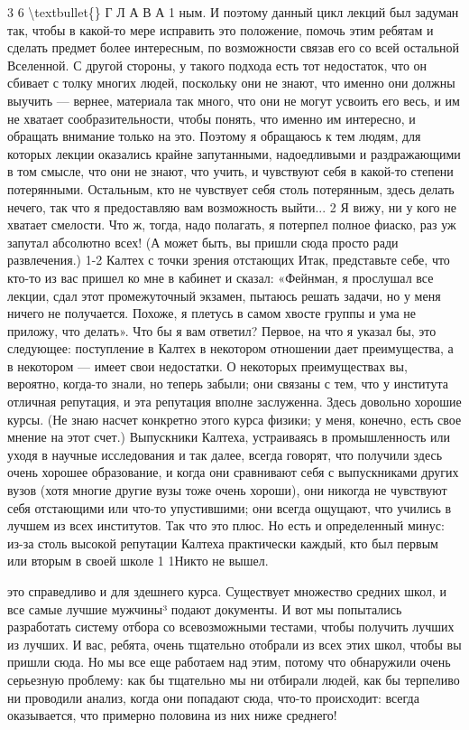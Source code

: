 \documentclass[10pt,oneside]{article}
\begin{document}
3 6 \textbackslash{}textbullet\{\} Г Л А В А  1 ным. И поэтому данный цикл лекций был задуман так, чтобы в какой-то мере исправить это положение, помочь этим ребятам и сделать предмет более интересным, по возможности связав его со всей остальной Вселенной. С другой стороны, у такого подхода есть тот недостаток, что он сбивает с толку многих людей, поскольку они не знают, что именно они должны выучить --- вернее, материала так много, что они не могут усвоить его весь, и им не хватает сообразительности, чтобы понять, что именно им интересно, и обращать внимание только на это. Поэтому я обращаюсь к тем людям, для которых лекции оказались крайне запутанными, надоедливыми и раздражающими в том смысле, что они не знают, что учить, и чувствуют себя в какой-то степени потерянными. Остальным, кто не чувствует себя столь потерянным, здесь делать нечего, так что я предоставляю вам возможность выйти... 2 Я вижу, ни у кого не хватает смелости. Что ж, тогда, надо полагать, я потерпел полное фиаско, раз уж запутал абсолютно всех! (А может быть, вы пришли сюда просто ради развлечения.) 1-2 Калтех с точки зрения отстающих Итак, представьте себе, что кто-то из вас пришел ко мне в кабинет и сказал: «Фейнман, я прослушал все лекции, сдал этот промежуточный экзамен, пытаюсь решать задачи, но у меня ничего не получается. Похоже, я плетусь в самом хвосте группы и ума не приложу, что делать». Что бы я вам ответил? Первое, на что я указал бы, это следующее: поступление в Калтех в некотором отношении дает преимущества, а в некотором --- имеет свои недостатки. О некоторых преимуществах вы, вероятно, когда-то знали, но теперь забыли; они связаны с тем, что у института отличная репутация, и эта репутация вполне заслуженна. Здесь довольно хорошие курсы. (Не знаю насчет конкретно этого курса физики; у меня, конечно, есть свое мнение на этот счет.) Выпускники Калтеха, устраиваясь в промышленность или уходя в научные исследования и так далее, всегда говорят, что получили здесь очень хорошее образование, и когда они сравнивают себя с выпускниками других вузов (хотя многие другие вузы тоже очень хороши), они никогда не чувствуют себя отстающими или что-то упустившими; они всегда ощущают, что учились в лучшем из всех институтов. Так что это плюс. Но есть и определенный минус: из-за столь высокой репутации Калтеха практически каждый, кто был первым или вторым в своей школе 1 1Никто не вышел.\par

это справедливо и для здешнего курса. Существует множество средних школ, и все самые лучшие мужчины³ подают документы. И вот мы попытались разработать систему отбора со всевозможными тестами, чтобы получить лучших из лучших. И вас, ребята, очень тщательно отобрали из всех этих школ, чтобы вы пришли сюда. Но мы все еще работаем над этим, потому что обнаружили очень серьезную проблему: как бы тщательно мы ни отбирали людей, как бы терпеливо ни проводили анализ, когда они попадают сюда, что-то происходит: всегда оказывается, что примерно половина из них ниже среднего!\par
\end{document}
